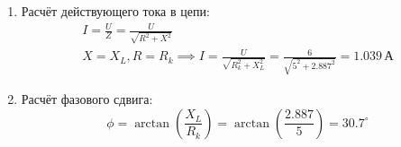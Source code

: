 \begin{enumerate}
	\item Расчёт действующего тока в цепи:
	      \[
		      \begin{gathered}
			      I = \frac{U}{Z} = \frac{U}{\sqrt{R^2 + X^2}} \\
			      X = X_L, R = R_k \implies I = \frac{U}{\sqrt{R_k^2+X_L^2}} = \frac{6}{\sqrt{5^2+2.887^2}} = 1.039 \, \text{А}
		      \end{gathered}
	      \]
	\item Расчёт фазового сдвига:
	      \[
		      \phi = \arctan\left(\frac{X_L}{R_k}\right) = \arctan\left(\frac{2.887}{5}\right) = 30.7^{\circ}
	      \]
\end{enumerate}
